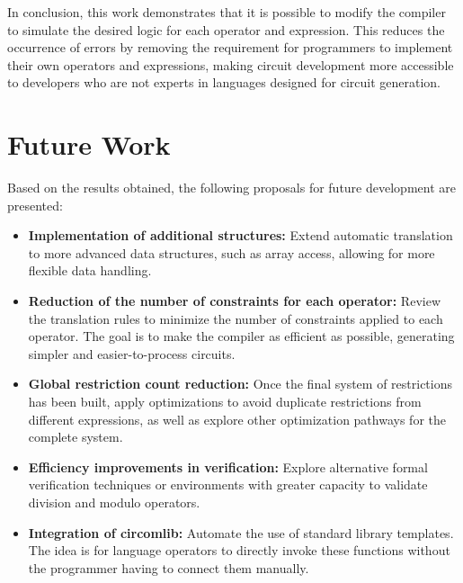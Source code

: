 \documentclass[a4paper,12pt]{report}
\begin{document}
	\vspace{0.2cm}
	\noindent In conclusion, this work demonstrates that it is possible to modify the compiler to simulate the desired logic for each operator and expression. This reduces the occurrence of errors by removing the requirement for programmers to implement their own operators and expressions, making circuit development more accessible to developers who are not experts in languages designed for circuit generation.
	
	\section{Future Work}
	
	\noindent Based on the results obtained, the following proposals for future development are presented:
	
	\begin{itemize}
		\item \textbf{Implementation of additional structures:} Extend automatic translation to more advanced data structures, such as array access, allowing for more flexible data handling.
		
		\item \textbf{Reduction of the number of constraints for each operator:} Review the translation rules to minimize the number of constraints applied to each operator. The goal is to make the compiler as efficient as possible, generating simpler and easier-to-process circuits.
		
		\item \textbf{Global restriction count reduction:} Once the final system of restrictions has been built, apply optimizations to avoid duplicate restrictions from different expressions, as well as explore other optimization pathways for the complete system.
		
		\item \textbf{Efficiency improvements in verification:} Explore alternative formal verification techniques or environments with greater capacity to validate division and modulo operators.
		
		\item \textbf{Integration of circomlib:} Automate the use of standard library templates. The idea is for language operators to directly invoke these functions without the programmer having to connect them manually.
		
	\end{itemize}
	
	
	
\end{document}
